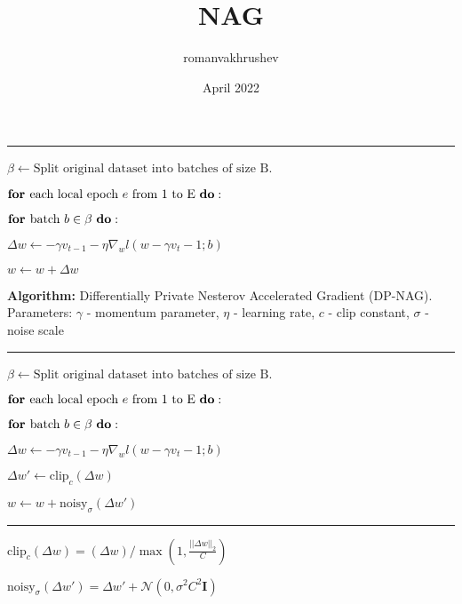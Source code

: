 \documentclass[12pt]{article}
\title{NAG}
\author{romanvakhrushev }
\date{April 2022}
\newcommand\mytab{\tab \hspace{-5cm}}
\newcommand\mytabtwo{\tab \hspace{-4cm}}
\begin{document}


\par\noindent\rule{\textwidth}{0.4pt}

$\beta \leftarrow \text{Split original dataset into batches of size B}$.

$\text{\bf for } \text{each local epoch } e \text{ from 1 to E } \text{\bf do}:$

\mytab $\text{\bf for } \text{batch } b \in \beta \text{ }\text{\bf do}:$

\mytabtwo $\Delta w \leftarrow - \gamma v_{t -1} - \eta \nabla_w l(w - \gamma v_t - 1;b) $

\mytabtwo $w \leftarrow w + \Delta w$

\bigbreak

{\bf Algorithm:} Differentially Private Nesterov Accelerated Gradient (DP-NAG). Parameters: $\gamma$ - momentum parameter, $\eta$ - learning rate, $c$ - clip constant, $\sigma$ - noise scale 

\par\noindent\rule{\textwidth}{0.4pt}

$\beta \leftarrow \text{Split original dataset into batches of size B}$.

$\text{\bf for } \text{each local epoch } e \text{ from 1 to E } \text{\bf do}:$

\mytab $\text{\bf for } \text{batch } b \in \beta \text{ }\text{\bf do}:$

\mytabtwo $\Delta w \leftarrow - \gamma v_{t -1} - \eta \nabla_w l(w - \gamma v_t - 1;b) $

\mytabtwo $\Delta w' \leftarrow \text{clip}_c(\Delta w)$

\mytabtwo $w \leftarrow w + \text{noisy}_{\sigma}(\Delta w')$

\par\noindent\rule{\textwidth}{0.4pt}

$\text{clip}_c(\Delta w) = (\Delta w)/\max(1,\frac{|| \Delta w ||_2}{C})$

$\text{noisy}_{\sigma} (\Delta w') = \Delta w' + \mathcal{N}(0,\sigma^2 C^2 \mathbf I)$
\end{document}
